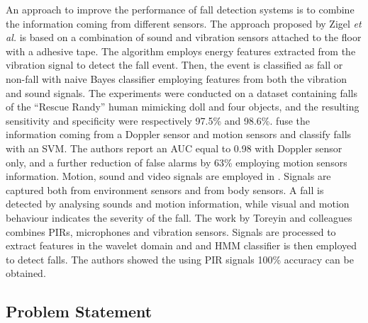 An approach to improve the performance of fall detection systems is to combine the information coming from different sensors. The approach proposed by Zigel \textit{et al.} \cite{zigel2009method} is based on a combination of sound and vibration sensors attached to the floor with a adhesive tape. The algorithm employs energy features extracted from the vibration signal to detect the fall event. Then, the event is classified as fall or non-fall with naive Bayes classifier employing features from both the vibration and sound signals. The experiments were conducted on a dataset containing falls of the ``Rescue Randy'' human mimicking doll and four objects, and the resulting sensitivity and specificity were respectively 97.5\% and 98.6\%. \cite{Liu2014} fuse the information coming from a Doppler sensor and motion sensors and classify falls with an SVM. The authors report an AUC equal to 0.98 with Doppler sensor only, and a further reduction of false alarms by 63\% employing motion sensors information. Motion, sound and video signals are employed in \cite{Doukas2011}. Signals are captured both from environment sensors and from body sensors. A fall is detected by analysing sounds and motion information, while visual and motion behaviour indicates the severity of the fall. The work by Toreyin and colleagues \cite{Toreyin2008} combines PIRs, microphones and vibration sensors. Signals are processed to extract features in the wavelet domain and and HMM classifier is then employed to detect falls. The authors showed the using PIR signals 100\% accuracy can be obtained.

\subsection{Problem Statement}


